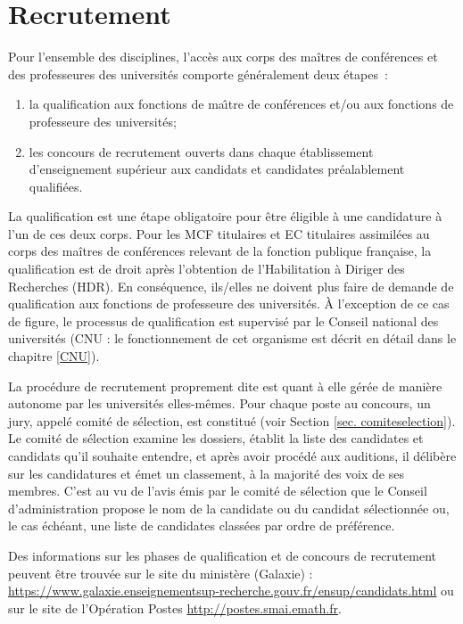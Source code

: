 \section{Recrutement}
\label{recrutement}

Pour l'ensemble des disciplines, l'acc\`es aux corps
des ma\^itres de conf\'erences et des professeur\mp e\mp s des universit\'es comporte
g\'en\'eralement deux \'etapes~:
\begin{enumerate}
\item la qualification aux fonctions
de ma\^\i tre de conf\'erences et/ou aux fonctions de professeur\mp e des
universit\'es;
\item les concours de recrutement ouverts dans chaque \'etablissement
d'enseignement sup\'erieur aux candidats et candidates pr\'ealablement
qualifi\'e\mp e\mp s.
\end{enumerate}

La qualification est une \'etape obligatoire pour \^etre \'eligible \`a une candidature \`a l'un de ces deux corps. Pour les MCF titulaires et EC titulaires assimil\'e\mp e\mp s au corps des ma\^itres de conf\'erences relevant de la fonction publique française, la qualification est de droit apr\`es l'obtention de l'Habilitation \`a Diriger des Recherches (HDR). En cons\'equence, ils/elles ne doivent plus faire de demande de qualification aux fonctions de professeur\mp e des universit\'es. \`A l'exception de ce cas de figure, le processus de qualification est supervis\'e par le Conseil national des universit\'es (CNU : le fonctionnement de cet organisme est d\'ecrit en d\'etail dans le chapitre \ref{CNU}). 


La proc\'edure de recrutement proprement dite est quant \`a elle g\'er\'ee de mani\`ere autonome par les universit\'es elles-m\^emes. Pour chaque poste au concours, un jury, appel\'e comit\'e de s\'election, est constitu\'e (voir Section \ref{sec. comiteselection}). Le comit\'e de s\'election examine les dossiers, \'etablit la liste des candidates et candidats qu'il souhaite entendre, et apr\`es avoir proc\'ed\'e aux auditions, il d\'elib\`ere sur les candidatures et \'emet un classement, \`a la majorit\'e des voix de ses membres. C'est au vu de l'avis \'emis par le comit\'e de s\'election que le Conseil d'administration propose le nom de la candidate ou du candidat s\'electionn\'e\mp e ou, le cas \'ech\'eant, une liste de candidat\mp e\mp s class\'e\mp e\mp s par ordre de pr\'ef\'erence.

Des informations sur les phases de qualification et de concours de recrutement peuvent \^etre trouv\'ee sur le site du minist\`ere (Galaxie) : \url{https://www.galaxie.enseignementsup-recherche.gouv.fr/ensup/candidats.html} ou sur le site de l'Op\'eration Postes \url{http://postes.smai.emath.fr}.



